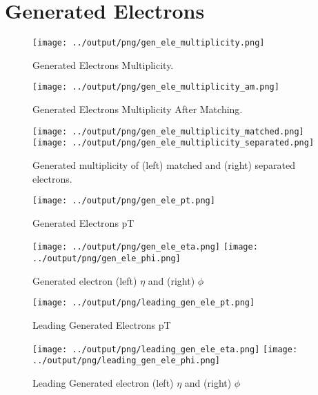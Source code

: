 \documentclass[11pt]{book}
\begin{document}
\section{Generated Electrons}

\begin{figure}[ht]
\centering
\texttt{[image: ../output/png/gen\_ele\_multiplicity.png]}
\caption{Generated Electrons Multiplicity.}
\label{fig:gen_ele_multiplicity}
\end{figure}

\begin{figure}[ht]
\centering
\texttt{[image: ../output/png/gen\_ele\_multiplicity\_am.png]}
\caption{Generated Electrons Multiplicity After Matching.}
\label{fig:gen_ele_multiplicity_am}
\end{figure}


\begin{figure}[ht]
\centering
\texttt{[image: ../output/png/gen\_ele\_multiplicity\_matched.png]}
\texttt{[image: ../output/png/gen\_ele\_multiplicity\_separated.png]}
\caption{Generated multiplicity of (left) matched and (right) separated electrons.}
\label{fig:gn_ele_mat_sep}
\end{figure}

\begin{figure}[ht]
\centering
\texttt{[image: ../output/png/gen\_ele\_pt.png]}
\caption{Generated Electrons pT}
\label{fig:gen_ele_pt}
\end{figure}
\clearpage

\begin{figure}[ht]
\centering
\texttt{[image: ../output/png/gen\_ele\_eta.png]}
\texttt{[image: ../output/png/gen\_ele\_phi.png]}
\caption{Generated electron (left) $\eta$ and (right) $\phi$}
\label{fig:gen_ele_eta_phi}
\end{figure}

\begin{figure}[ht]
\centering
\texttt{[image: ../output/png/leading\_gen\_ele\_pt.png]}
\caption{Leading Generated Electrons pT}
\label{fig:leading_gen_ele_pt}
\end{figure}

\begin{figure}[ht]
\centering
\texttt{[image: ../output/png/leading\_gen\_ele\_eta.png]}
\texttt{[image: ../output/png/leading\_gen\_ele\_phi.png]}
\caption{Leading Generated electron (left) $\eta$ and (right) $\phi$}
\label{fig:leading_gen_ele_eta_phi}
\end{figure}
\clearpage
\end{document}
